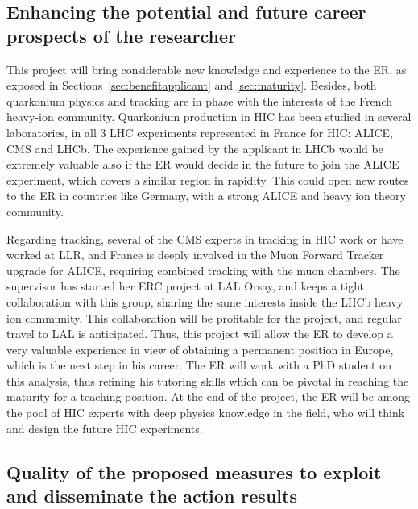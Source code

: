 \documentclass[a4paper,11pt]{article}
\newcommand{\ER}{ER\xspace}
\newcommand{\Supervisor}{The supervisor\xspace}
\begin{document}
%               

\subsection{Enhancing the potential and future career prospects of the researcher }
\label{sec:enhancement}

This project will bring considerable new knowledge and experience to the \ER, as exposed in Sections~\ref{sec:benefitapplicant} and \ref{sec:maturity}. Besides, both quarkonium physics and tracking are in phase with the interests of the French heavy-ion community. Quarkonium production in HIC has been studied in several laboratories, in all 3 LHC experiments represented in France for HIC: ALICE, CMS and LHCb. 
The experience gained by the applicant in LHCb would be extremely valuable
also if the \ER would decide in the future to join the ALICE experiment, which 
covers a similar region in rapidity. This could open new routes to the \ER 
in countries like Germany, with a strong ALICE and heavy ion theory community.

Regarding tracking, several of the CMS experts in tracking in HIC work or have worked at LLR, and France is deeply involved in the Muon Forward Tracker upgrade for ALICE, requiring combined tracking with the muon chambers. \Supervisor has started her ERC project at LAL Orsay, and keeps a tight collaboration with this group, sharing the same interests inside the LHCb heavy ion community. This collaboration will be profitable for the project, and regular travel to LAL is anticipated. Thus, this project will allow the \ER to develop a very valuable experience in view of obtaining a permanent position in Europe, which is the next step in his career. The \ER will work with a PhD student on this analysis,
thus refining his tutoring skills which can be pivotal in reaching the maturity for a teaching position. At the end of the project, the \ER will be among the pool of HIC experts with deep physics knowledge in the field, who will think and design the future HIC experiments. 



%                

\subsection{Quality of the proposed measures to exploit and disseminate the action results }
\end{document}
